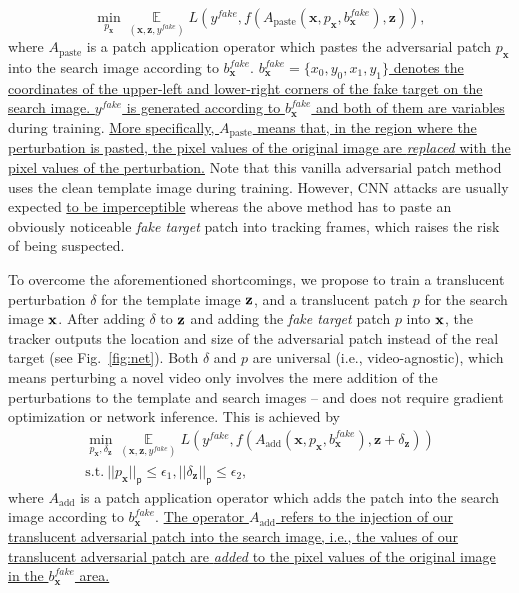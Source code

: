 \documentclass[journal]{IEEEtran}
\newcommand{\ie}{i.e.}
\begin{document}
\begin{equation}
    \min\limits_{p_\textbf{x}} \mathop{\mathbb{E}}\limits_{(\textbf{x}, \textbf{z}, y^{fake})} L(y^{fake}, f(A_{\text{paste}}(\textbf{x}, p_\textbf{x}, b^{fake}_{\textbf{x}}), \textbf{z})),
\end{equation}
where $A_{\text{paste}}$ is a patch application operator \cite{patch} which pastes the adversarial patch $p_\textbf{x}$ into the search image according to $b^{fake}_{\textbf{x}}$.
\uline{$b^{fake}_{\textbf{x}} = \{x_0, y_0, x_1, y_1\}$ denotes the coordinates of the upper-left and lower-right corners of the fake target on the search image. $y^{fake}$ is generated according to $b^{fake}_{\textbf{x}}$ and both of them are variables} during training.
\uline{More specifically, $A_\text{paste}$ means that, in the region where the perturbation is pasted, the pixel values of the original image are \textit{replaced} with the pixel values of the perturbation.}
Note that this vanilla adversarial patch method uses the clean template image during training. However, CNN attacks are usually expected \uline{to be imperceptible} whereas the above method has to paste an obviously noticeable \textit{fake target} patch into tracking frames, which raises the risk of being suspected.

To overcome the aforementioned shortcomings, we propose to train a translucent perturbation $\delta$ for the template image $\textbf z$, and a translucent patch $p$ for the search image $\textbf x$. 
After adding $\delta$ to $\textbf z$ and adding the \textit{fake target} patch $p$ into $\textbf x$, the tracker outputs the location and size of the adversarial patch instead of the real target (see Fig.~\ref{fig:net}). Both $\delta$ and $p$ are universal (\ie, video-agnostic), which means perturbing a novel video only involves the mere addition of the perturbations to the template and search images -- and does not require gradient optimization or network inference. This is achieved by
\begin{equation}
  \begin{gathered}
    \min\limits_{p_\textbf{x}, \delta_\textbf{z}} \mathop{\mathbb{E}}\limits_{(\textbf{x}, \textbf{z}, y^{fake})} L(y^{fake}, f(A_{\text{add}}(\textbf{x}, p_\textbf{x}, b^{fake}_{\textbf{x}}), \textbf{z} + \delta_\textbf{z}))\\
    \text{s.t.}\ ||p_\textbf{x}||_{\mathsf{p}} \le \epsilon_1, ||\delta_\textbf{z}||_{\mathsf{p}} \le \epsilon_2,
  \end{gathered}
\end{equation}
where $A_{\text{add}}$ is a patch application operator which adds the patch into the search image according to $b^{fake}_{\textbf{x}}$.
\uline{The operator $A_\text{add}$ refers to the injection of our translucent adversarial patch into the search image, \ie, the values of our translucent adversarial patch are \textit{added} to the pixel values of the original image in the $b^{fake}_{\textbf{x}}$ area.}
\end{document}
